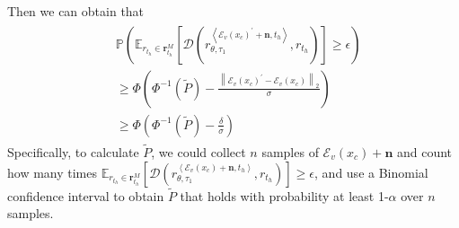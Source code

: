 Then we can obtain that 
\begin{align}
\begin{split}
&\mathbb{P}(\mathbb{E}_{r_{t_h}\in\mathbf{r}_{t_h}^M}[\mathcal{D}(r_{\theta, \tau_1}^{\left<\mathcal{E}_v(x_c)^{\prime}+\mathbf{n}, t_h\right>}, r_{t_h})]\geq\epsilon)\\
&\geq\Phi(\Phi^{-1}(\tilde{P})-\frac{\left\|\mathcal{E}_v(x_c)^{\prime}-\mathcal{E}_v(x_c)\right\|_2}{\sigma})\\
&\geq\Phi(\Phi^{-1}(\tilde{P})-\frac{\delta}{\sigma})
\end{split}
\end{align}
Specifically, to calculate $\tilde{P}$, we could collect $n$ samples of $\mathcal{E}_v(x_c)+\mathbf{n}$ and count how many times $\mathbb{E}_{r_{t_h}\in\mathbf{r}_{t_h}^M}[\mathcal{D}(r_{\theta, \tau_1}^{\left<\mathcal{E}_v(x_c)+\mathbf{n}, t_h\right>}, r_{t_h})]\geq\epsilon$, and use a Binomial confidence interval to obtain $\tilde{P}$ that holds with probability at least 1-$\alpha$ over $n$ samples.

